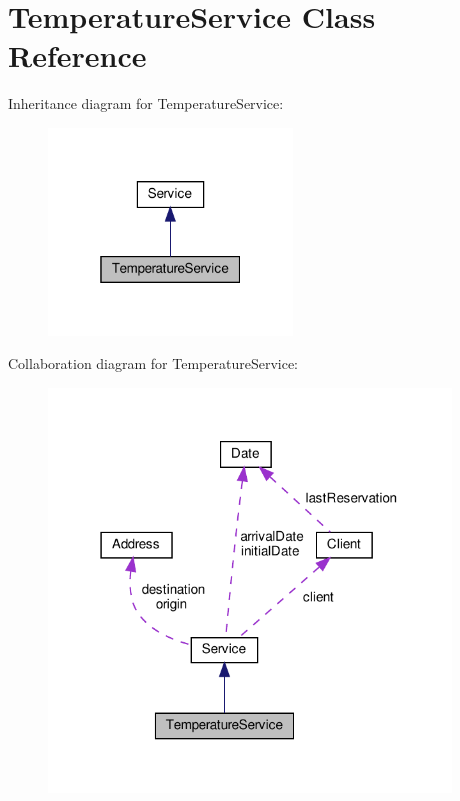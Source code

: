 \hypertarget{class_temperature_service}{}\section{Temperature\+Service Class Reference}
\label{class_temperature_service}


Inheritance diagram for Temperature\+Service\+:\nopagebreak
\begin{figure}[H]
\begin{center}
\leavevmode
\includegraphics[width=184pt]{class_temperature_service__inherit__graph}
\end{center}
\end{figure}


Collaboration diagram for Temperature\+Service\+:
\nopagebreak
\begin{figure}[H]
\begin{center}
\leavevmode
\includegraphics[width=303pt]{class_temperature_service__coll__graph}
\end{center}
\end{figure}
